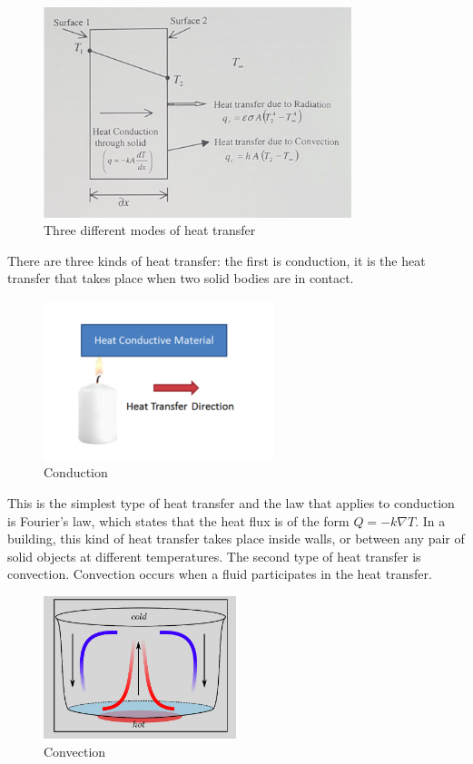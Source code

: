  \begin{figure}[H]
        \centering
		\includegraphics[width=0.8\textwidth]{"images/enkf/flux_1.png"}
		\caption{Three different modes of heat transfer}
\end{figure}
\noindent There are three kinds of heat transfer:  the first is conduction, it is the heat transfer that takes place when two solid bodies are in contact. 
 \begin{figure}[H]
        \centering
		\includegraphics[width=0.6\textwidth]{"images/enkf/flux_2.png"}
		\caption{Conduction}
\end{figure}
\noindent 
This is the simplest type of heat transfer and the law that applies to conduction is Fourier's law, which states that the heat flux is of the form $Q=-k\nabla T$. In a building, this kind of heat transfer takes place inside walls, or between any pair of solid objects at different temperatures.
\newline\noindent The second type of heat transfer is convection. Convection occurs when a fluid participates in the heat transfer.
\begin{figure}[H]
        \centering
		\includegraphics[width=0.5\textwidth]{"images/enkf/flux_5.png"}
		\caption{Convection}
\end{figure}
